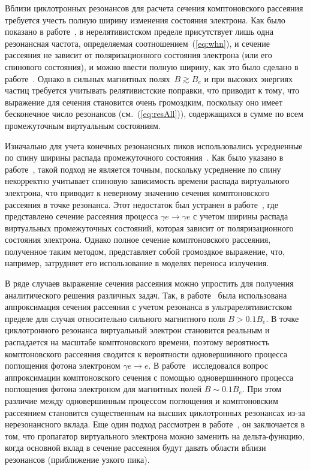 \documentclass[cp1251%
               ]{jetp} %
\begin{document}
Вблизи циклотронных резонансов для расчета сечения комптоновского рассеяния требуется учесть полную 
ширину изменения состояния электрона. Как было показано в работе~\cite{Canuto:1971}, в нерелятивистском пределе присутствует лишь одна резонансная частота, определяемая соотношением~(\ref{eq:whn}), и сечение рассеяния
не зависит от поляризационного состояния электрона (или его спинового состояния), и можно ввести полную ширину, как это было сделано в работе~\cite{Daugherty:1989}. Однако в сильных магнитных полях~$B\gtrsim B_e$ и при высоких энергиях частиц требуется учитывать релятивистские поправки, что приводит к тому, что выражение для сечения становится очень громоздким, поскольку оно имеет бесконечное число резонансов (см.~(\ref{eq:resAll})), содержащихся в сумме по всем промежуточным виртуальным состояниям.

Изначально для учета конечных резонансных пиков использовались усредненные по спину ширины распада промежуточного состояния~\cite{Gonthier:2000, Holodov:2000}. 
Как было указано в работе~\cite{Gonthier:2014}, такой подход не является 
точным, поскольку усреднение по спину некорректно учитывает спиновую 
зависимость времени распада виртуального электрона, что приводит к неверному значению сечения комптоновского рассеяния в точке 
резонанса. Этот недостаток был устранен в работе~\cite{Mushtukov:2016}, где 
представлено сечение рассеяния процесса $\gamma e\to \gamma e$ с учетом 
ширины распада виртуальных промежуточных состояний, которая 
зависит от 
поляризационного состояния электрона. 
Однако полное сечение комптоновского рассеяния, полученное таким методом, 
представляет собой громоздкое выражение, что, например, затрудняет его 
использование в моделях переноса излучения. 

В ряде случаев выражение сечения рассеяния можно упростить для получения аналитического решения различных задач. 
Так, в работе~\cite{Gonthier:2000} была использована аппроксимация сечения рассеяния с учетом резонанса в ультрарелятивистском пределе для случая относительно сильного магнитного поля $B>0.1 B_e$. В точке циклотронного резонанса виртуальный электрон становится реальным и распадается на масштабе комптоновского времени, поэтому вероятность комптоновского рассеяния сводится к вероятности одновершинного процесса поглощения фотона электроном 
$\gamma e \to e$. В работе~\cite{Harding:1991} исследовался вопрос аппроксимации комптоновского сечения с помощью одновершинного процесса поглощения фотона электроном для магнитных полей $B\sim 0.1B_e$. При этом различие между одновершинным процессом поглощения и комптоновским рассеянием становится существенным на высших циклотронных резонансах из-за нерезонансного вклада. Еще один подход рассмотрен в работе~\cite{Rumyantsev:2017}, он заключается в том, что пропагатор виртуального электрона можно заменить на дельта-функцию, когда основной вклад 
в сечение рассеяния будут давать области вблизи резонансов (приближение узкого пика). 
\end{document}
